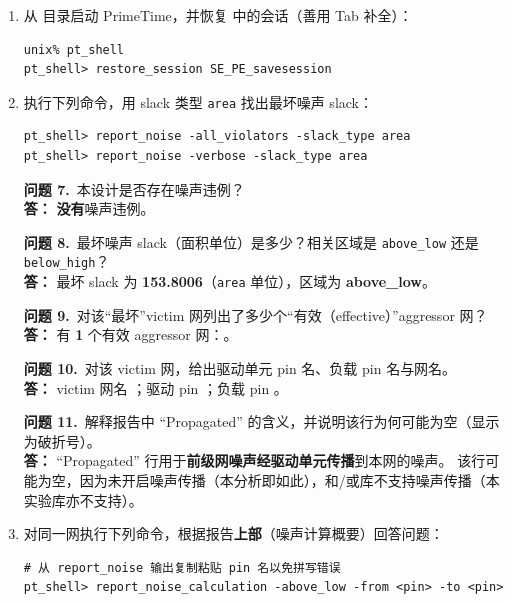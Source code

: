 \begin{enumerate}
  \item 从  目录启动 PrimeTime，并恢复  中的会话（善用 Tab 补全）：
\begin{lstlisting}
unix% pt_shell
pt_shell> restore_session SE_PE_savesession
\end{lstlisting}

  \item 执行下列命令，用 slack 类型 \texttt{area} 找出最坏噪声 slack：
\begin{lstlisting}
pt_shell> report_noise -all_violators -slack_type area
pt_shell> report_noise -verbose -slack_type area
\end{lstlisting}

\begin{questionBox}
\textbf{问题 7.}\ 本设计是否存在噪声违例？\\[0.35em]
\textbf{答：} \textbf{没有}噪声违例。

\textbf{问题 8.}\ 最坏噪声 slack（面积单位）是多少？相关区域是 \texttt{above\_low} 还是 \texttt{below\_high}？\\[0.35em]
\textbf{答：} 最坏 slack 为 \textbf{153.8006}（\texttt{area} 单位），区域为 \textbf{above\_low}。

\textbf{问题 9.}\ 对该“最坏”victim 网列出了多少个“有效（effective）”aggressor 网？\\[0.35em]
\textbf{答：} 有 \textbf{1} 个有效 aggressor 网：。

\textbf{问题 10.}\ 对该 victim 网，给出驱动单元 pin 名、负载 pin 名与网名。\\[0.35em]
\textbf{答：} victim 网名 ；驱动 pin ；负载 pin 。

\textbf{问题 11.}\ 解释报告中 ``Propagated'' 的含义，并说明该行为何可能为空（显示为破折号）。\\[0.35em]
\textbf{答：} ``Propagated'' 行用于\textbf{前级网噪声经驱动单元传播}到本网的噪声。
该行可能为空，因为未开启噪声传播（本分析即如此），和/或库不支持噪声传播（本实验库亦不支持）。
\end{questionBox}

  \item 对同一网执行下列命令，根据报告\textbf{上部}（噪声计算概要）回答问题：
\begin{lstlisting}
# 从 report_noise 输出复制粘贴 pin 名以免拼写错误
pt_shell> report_noise_calculation -above_low -from <pin> -to <pin>
\end{lstlisting}


\end{enumerate}
